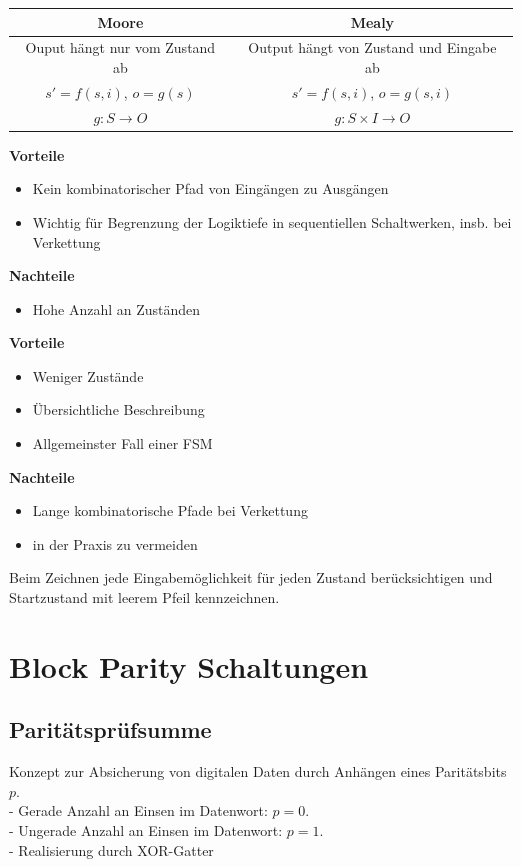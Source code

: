 \documentclass[6pt,a4paper]{scrartcl}
\newcommand{\ra}[0]{\ensuremath{\rightarrow}} 									%
\begin{document}
\begin{multicols*}{3}
\begin{tabular}{c | c}
 Moore & Mealy \\ \hline
 Ouput hängt nur vom Zustand ab & Output hängt von Zustand und Eingabe ab\\
 $s'=f(s,i)$, $o=g(s)$ &  $s'=f(s,i)$, $o=g(s,i)$ \\
 $g: S \ra O$ & $g: S \times I \ra O$
\end{tabular}

\begin{multicols}{2}
\noindent\textbf{Vorteile}
\begin{itemize} \itemsep0pt
 \item Kein kombinatorischer Pfad von Eingängen zu Ausgängen
 \item Wichtig für Begrenzung der Logiktiefe in sequentiellen Schaltwerken, insb. bei Verkettung
\end{itemize}
\textbf{Nachteile}
\begin{itemize} \itemsep0pt
 \item Hohe Anzahl an Zuständen
\end{itemize}
\pagebreak
\textbf{Vorteile}
\begin{itemize} \itemsep0pt
 \item Weniger Zustände
 \item Übersichtliche Beschreibung
 \item Allgemeinster Fall einer FSM
\end{itemize}
\textbf{Nachteile}
\begin{itemize} \itemsep0pt
 \item Lange kombinatorische Pfade bei Verkettung
 \item in der Praxis zu vermeiden
\end{itemize}
\end{multicols}
Beim Zeichnen jede Eingabemöglichkeit für jeden Zustand berücksichtigen und Startzustand mit leerem Pfeil kennzeichnen.

\section{Block Parity Schaltungen}
\subsection{Paritätsprüfsumme}
Konzept zur Absicherung von digitalen Daten durch Anhängen eines Paritätsbits $p$.\\
- Gerade Anzahl an Einsen im Datenwort: $p = 0$.\\
- Ungerade Anzahl an Einsen im Datenwort: $p = 1$.\\
- Realisierung durch XOR-Gatter

\end{multicols*}
\end{document}
